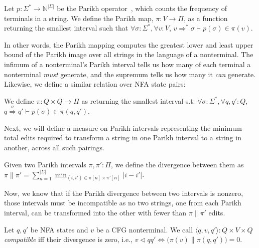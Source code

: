 \documentclass[runningheads]{llncs}
\begin{document}
  \begin{definition}\label{def:parikh}
    Let $p: \Sigma^*\rightarrow\mathbb{N}^{|\Sigma|}$ be the Parikh operator~\cite{parikh1966context}, which counts the frequency of terminals in a string. We define the Parikh map, $\pi: V \rightarrow \Pi$, as a function returning the smallest interval such that $\forall \sigma: \Sigma^*, \forall v: V$, $v \Rightarrow^* \sigma \vdash p(\sigma) \in \pi(v)$.
  \end{definition}

  In other words, the Parikh mapping computes the greatest lower and least upper bound of the Parikh image over all strings in the language of a nonterminal. The infimum of a nonterminal's Parikh interval tells us how many of each terminal a nonterminal \textit{must} generate, and the supremum tells us how many it \textit{can} generate. Likewise, we define a similar relation over NFA state pairs:

  \begin{definition}
    We define $\pi: Q\times Q \rightarrow \Pi$ as returning the smallest interval s.t. $\forall \sigma: \Sigma^*, \forall q, q': Q$, $q \overset{\sigma}{\Longrightarrow} q' \vdash p(\sigma) \in \pi(q, q')$.
  \end{definition}

  Next, we will define a measure on Parikh intervals representing the minimum total edits required to transform a string in one Parikh interval to a string in another, across all such pairings.

  \begin{definition}
    Given two Parikh intervals $\pi, \pi': \Pi$, we define the divergence between them as $\pi \parallel \pi' = \sum_{n=1}^{|\Sigma|} \min_{(i, i') \in \pi[n]\times \pi'[n]} |i - i'|$.
  \end{definition}

  Now, we know that if the Parikh divergence between two intervals is nonzero, those intervals must be incompatible as no two strings, one from each Parikh interval, can be transformed into the other with fewer than $\pi \parallel \pi'$ edits.

  \begin{definition}
    Let $q, q'$ be NFA states and $v$ be a CFG nonterminal. We call $\langle q, v, q'\rangle: Q\times V\times Q$ \textit{compatible} iff their divergence is zero, i.e., $v \lhd qq' \iff \big(\pi(v) \parallel \pi(q, q')\big) = 0$.
  \end{definition}
\end{document}
